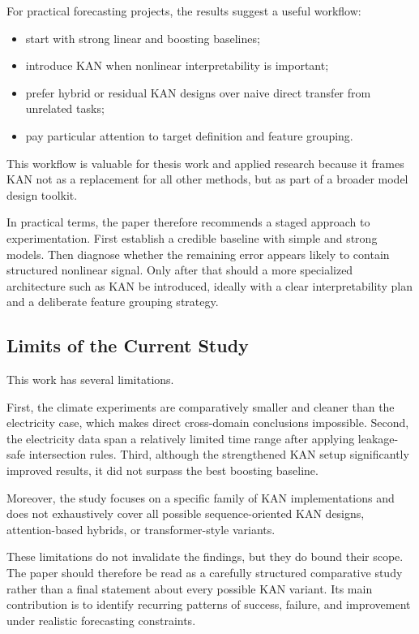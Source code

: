 \documentclass[10pt,conference,onecolumn]{IEEEtran}
\begin{document}
For practical forecasting projects, the results suggest a useful workflow:
\begin{itemize}
    \item start with strong linear and boosting baselines;
    \item introduce KAN when nonlinear interpretability is important;
    \item prefer hybrid or residual KAN designs over naive direct transfer from unrelated tasks;
    \item pay particular attention to target definition and feature grouping.
\end{itemize}

This workflow is valuable for thesis work and applied research because it frames KAN not as a replacement for all other methods, but as part of a broader model design toolkit.

In practical terms, the paper therefore recommends a staged approach to experimentation. First establish a credible baseline with simple and strong models. Then diagnose whether the remaining error appears likely to contain structured nonlinear signal. Only after that should a more specialized architecture such as KAN be introduced, ideally with a clear interpretability plan and a deliberate feature grouping strategy.

\subsection{Limits of the Current Study}

This work has several limitations.

First, the climate experiments are comparatively smaller and cleaner than the electricity case, which makes direct cross-domain conclusions impossible. Second, the electricity data span a relatively limited time range after applying leakage-safe intersection rules. Third, although the strengthened KAN setup significantly improved results, it did not surpass the best boosting baseline.

Moreover, the study focuses on a specific family of KAN implementations and does not exhaustively cover all possible sequence-oriented KAN designs, attention-based hybrids, or transformer-style variants.

These limitations do not invalidate the findings, but they do bound their scope. The paper should therefore be read as a carefully structured comparative study rather than a final statement about every possible KAN variant. Its main contribution is to identify recurring patterns of success, failure, and improvement under realistic forecasting constraints.
\end{document}
